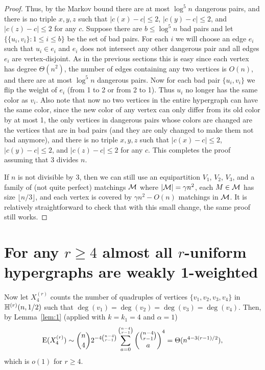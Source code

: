 \documentclass[12pt,reqno]{amsart}
\begin{document}
\begin{proof}
Thus, by the Markov bound \whp there are at most $\log^5 n$ dangerous pairs, and there is no triple $x, y, z$ such that  $|c(x)-c|\le 2$, $|c(y)-c|\le 2$, and $|c(z)-c| \le 2$ for any $c$. Suppose there are $b \le \log^5 n$ bad pairs and let  $\{\{u_i,v_i\}: 1 \le i \le b\}$ be the set of  bad pairs. For each $i$ we will choose an edge $e_i$ such that $u_i\in e_i$ and $e_i$ does not intersect any other dangerous pair and all edges $e_i$ are vertex-disjoint. As in the previous sections this is easy since each vertex has degree $\Theta(n^2)$, the number of edges containing any two vertices is $O(n)$, and there are at most $\log^5 n$ dangerous pairs. Now for each bad pair $\{u_i,v_i\}$ we flip the weight of $e_i$ (from 1 to 2 or from 2 to 1). Thus $u_i$ no longer has the same color as $v_i$. Also note that now no two vertices in the entire hypergraph can have the same color, since the new color of any vertex can only differ from its old color by at most 1, the only vertices in dangerous pairs whose colors are changed are the vertices that are in bad pairs (and they are only changed to make them not bad anymore), and there is no triple $x, y, z$ such that $|c(x)-c|\le 2$,  $|c(y)-c|\le 2$, and $|c(z)-c| \le 2$ for any $c$. This completes the proof assuming that 3 divides $n$.

If $n$ is not divisible by 3, then we can still use an equipartition $V_1$, $V_2$, $V_3$, and a family of (not quite perfect) matchings $\mathcal{M}$ where $|\mathcal{M}| = \gamma n^2$, each $M \in \mathcal{M}$ has size $\lfloor n/3 \rfloor$, and each vertex is covered by $\gamma n^2 - O(n)$ matchings in $\mathcal{M}$. It is relatively straightforward to check that with this small change, the same proof still works.
\end{proof}



\section{For any $r\ge 4$ almost all $r$-uniform hypergraphs are weakly 1-weighted}\label{sec:thm3:i}

Now let $X_{4}^{(r)}$ counts the number of quadruples of vertices $\{v_1,v_2,v_3,v_4\}$ in $\mathbb{H}^{({r})}(n,1/2)$ such that $\deg(v_1)=\deg(v_2)=\deg(v_3)=\deg(v_4)$.
Then, by Lemma~\ref{lem:1} (applied with $k=k_1=4$ and $\alpha=1$)
\begin{equation}
\mathrm{E}(X_4^{(r)}) \sim \binom{n}{4} 2^{-4\binom{n-4}{r-1}} \sum_{a=0}^{\binom{n-4}{r-1}} \binom{\binom{n-4}{r-1}}{a}^4
= \Theta(n^{4-3(r-1)/2}),
\end{equation}
which is $o(1)$ for $r\ge 4$. 
\end{document}
